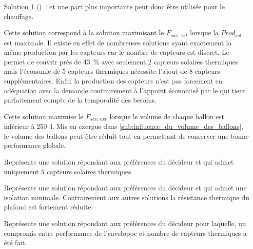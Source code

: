 \begin{blockdescription}{Solution 1 ()~:}
                                 et une part plus importante peut donc être utilisée pour le chauffage.
  \item[Solution 4 (\abr{S4})~:] Cette solution correspond à la solution maximisant le $F_{sav,\,ext}$ lorsque
                                 la $Prod_{sol}$ est maximale. Il existe en effet de nombreuses solutions ayant exactement
                                 la même production par les capteurs  car le nombre de capteurs est discret.
                                 Le  permet de couvrir près de \SI{43}{\percent} avec seulement $2$ capteurs
                                 solaires thermiques mais l’économie de $5$ capteurs thermiques nécessite l’ajout
                                 de $8$ capteurs  supplémentaires. Enfin
                                 la production des capteurs n’est pas forcement en adéquation avec la demande
                                 contrairement à l’appoint économisé par le  qui tient parfaitement compte
                                 de la temporalité des besoins.
  \item[Solution 5 (\abr{S5})~:] Cette solution maximise le $F_{sav,\,ext}$ lorsque le volume de chaque
                                 ballon est inférieur à \SI{250}{\litre}. Mis en exergue dans
                                 \ref{sub:influence_du_volume_des_ballons},
                                 le volume des ballons peut être réduit tout en permettant de
                                 conserver une bonne performance globale.
  \item[Solution 6 (\abr{S6})~:] Représente une solution répondant aux préférences du décideur
                                 et qui admet uniquement $5$ capteurs solaires thermiques.
  \item[Solution 7 (\abr{S7})~:] Représente une solution répondant aux préférences du décideur
                                 et qui admet une isolation minimale. Contrairement aux autres
                                 solutions la résistance thermique du plafond est fortement réduite.
  \item[Solution 8 (\abr{S8})~:] Représente une solution répondant aux préférences du décideur
                                 pour laquelle, un compromis entre performance de l’enveloppe
                                 et nombre de capteurs thermiques a été fait.
\end{blockdescription}

